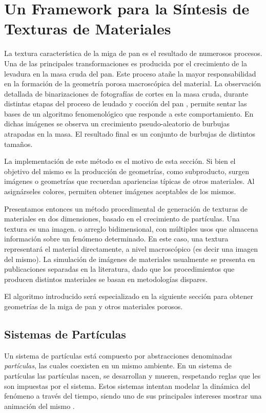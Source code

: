 \section[Síntesis de Texturas de Materiales]{Un Framework para la Síntesis de Texturas de Materiales}

La textura característica de la miga de pan es el resultado de numerosos procesos.
Una de las principales transformaciones es producida por el crecimiento de la levadura en la masa cruda del pan.
Este proceso atañe la mayor responsabilidad en la formación de la geometría porosa macroscópica del material.
La observación detallada de binarizaciones de fotografías de cortes en la masa cruda, durante distintas etapas del proceso de leudado y cocción del pan \cite{Scanlon2001}, permite sentar las bases de un algoritmo fenomenológico que responde a este comportamiento.
En dichas imágenes se observa un crecimiento pseudo-aleatorio de burbujas atrapadas en la masa.
El resultado final es un conjunto de burbujas de distintos tamaños.

La implementación de este método es el motivo de esta sección.
Si bien el objetivo del mismo es la producción de geometrías, como subproducto, surgen imágenes o geometrías que recuerdan apariencias típicas de otros materiales.
Al asignárseles colores, permiten obtener imágenes aceptables de los mismos.

Presentamos entonces un método procedimental de generación de texturas de materiales en dos dimensiones, basado en el crecimiento de partículas.
Una textura es una imagen. o arreglo bidimensional, con múltiples usos que almacena información sobre un fenómeno determinado.
En este caso, una textura representará el material directamente, a nivel macroscópico (es decir una imagen del mismo).
La simulación de imágenes de materiales usualmente se presenta en publicaciones separadas en la literatura, dado que los procedimientos que producen distintos materiales se basan en metodologías dispares.

El algoritmo introducido será especializado en la siguiente sección para obtener geometrías de la miga de pan y otros materiales porosos.


\subsection{Sistemas de Partículas}
Un sistema de partículas está compuesto por abstracciones denominadas {\em partículas}, las cuales coexisten en un mismo ambiente.
En un sistema de part\'iculas \cite{Reeves1983} las part\'iculas nacen, se desarrollan y mueren, respetando reglas que les son impuestas por el sistema. Estos sistemas intentan modelar la din\'amica del fen\'omeno a trav\'es del tiempo, siendo uno de sus principales intereses mostrar una animaci\'on del mismo \cite{Gao2010, Bagar2010, Lentine2010}.

